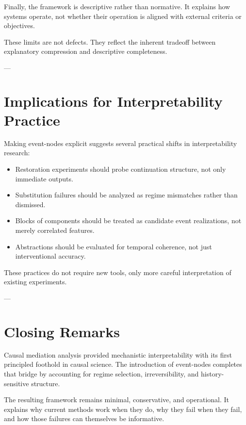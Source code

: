\documentclass[11pt]{article}
\theoremstyle{remark}
\begin{document}
Finally, the framework is descriptive rather than normative. It explains how systems operate, not whether their operation is aligned with external criteria or objectives.

These limits are not defects. They reflect the inherent tradeoff between explanatory compression and descriptive completeness.

---

\section{Implications for Interpretability Practice}

Making event-nodes explicit suggests several practical shifts in interpretability research:
\begin{itemize}
\item Restoration experiments should probe continuation structure, not only immediate outputs.
\item Substitution failures should be analyzed as regime mismatches rather than dismissed.
\item Blocks of components should be treated as candidate event realizations, not merely correlated features.
\item Abstractions should be evaluated for temporal coherence, not just interventional accuracy.
\end{itemize}

These practices do not require new tools, only more careful interpretation of existing experiments.

---

\section{Closing Remarks}

Causal mediation analysis provided mechanistic interpretability with its first principled foothold in causal science. The introduction of event-nodes completes that bridge by accounting for regime selection, irreversibility, and history-sensitive structure.

The resulting framework remains minimal, conservative, and operational. It explains why current methods work when they do, why they fail when they fail, and how those failures can themselves be informative.
\end{document}
